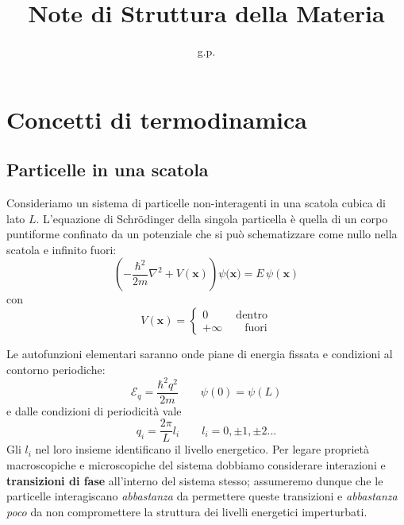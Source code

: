 \documentclass[a4paper]{report}
\title{Note di Struttura della Materia}
\author{g.p.}
\date{}
\begin{document}
\maketitle




\tableofcontents

\chapter{Concetti di termodinamica}
\section{Particelle in una scatola}
Consideriamo un sistema di particelle non-interagenti in una scatola cubica di lato $L$. L'equazione di Schr\"{o}dinger della singola particella è quella di un corpo puntiforme confinato da un potenziale che si può schematizzare come nullo nella scatola e infinito fuori: 
\begin{equation}
    \left(-\frac{\hbar^2}{2m}\nabla^2 + V(\mathbf{x})\right)\psi(\mathbf{x)} = E\,\psi(\mathbf{x})
\end{equation}
con 
\[
    V(\mathbf{x})=\left\{
                \begin{array}{ll}
                  0 \,\,\,\qquad\text{dentro}\\
                 +\infty\qquad \text{fuori}
                \end{array}
              \right.
\]

Le autofunzioni elementari saranno onde piane di energia fissata e condizioni al contorno periodiche:
\begin{equation}
    \mathcal{E}_q = \frac{\hbar^2q^2}{2m} \qquad \psi(0) = \psi(L)
\end{equation}
e dalle condizioni di periodicità vale
\begin{equation}
    q_i = \frac{2\pi}{L}l_i\qquad l_i = 0,\pm 1,\pm 2...
\end{equation}
Gli $l_i$ nel loro insieme identificano il livello energetico. Per legare proprietà macroscopiche e microscopiche del sistema dobbiamo considerare interazioni e \textbf{transizioni di fase} all'interno del sistema stesso; assumeremo dunque che le particelle interagiscano \textit{abbastanza} da permettere queste transizioni e \textit{abbastanza poco} da non compromettere la struttura dei livelli energetici imperturbati. 
\end{document}
